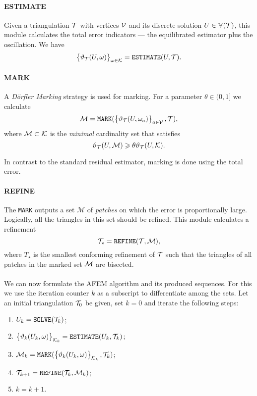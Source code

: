 \documentclass[thesis.tex]{subfiles}
\begin{document}
\paragraph{ESTIMATE} Given a triangulation $\mathcal{T}$ with vertices $\mathcal{V}$ and its discrete solution $U \in \mathbb{V}(\mathcal{T})$, this module 
calculates the total error indicators --- the equilibrated estimator plus the oscillation. We have
\[
  \set{\vartheta_{\mathcal{T}}(U, \omega)}_{\omega \in \mathcal{K}} = \texttt{ESTIMATE}(U, \mathcal{T}).
\]
\paragraph{MARK}
A \emph{D\"orfler Marking} strategy is used for marking. For a parameter $\theta \in (0,1]$ we calculate
\[
  \mathcal{M} = \texttt{MARK}( \set{\vartheta_{\mathcal{T}}(U, \omega_a)}_{a \in \mathcal{V}}, \mathcal{T}),
\]
where $\mathcal{M} \subset \mathcal{K}$ is the \emph{minimal} cardinality set that satisfies
\[
  \vartheta_{\mathcal{T}}(U,\mathcal{M}) \geqslant \theta \vartheta_{\mathcal{T}}(U, \mathcal{K}).
\]
\begin{rem}
  In contrast to the standard residual estimator, marking is done using the total error.
\end{rem}
\paragraph{REFINE}
The \texttt{MARK} outputs a set $\mathcal{M}$ of \emph{patches} on which the error is proportionally large. 
Logically, all the triangles in this set should be refined. This module calculates a refinement
\[
  \mathcal{T}_\star = \texttt{REFINE}(\mathcal{T}, \mathcal{M}),
\]
where $T_\star$ is the smallest conforming refinement of $\mathcal{T}$ such that the triangles of
all patches in the marked set $\mathcal{M}$ are bisected.
\\\\
We can now formulate the AFEM algorithm and its produced sequences. For this we use the
iteration counter $k$ as a subscript to differentiate among the sets.
Let an initial triangulation $\mathcal{T}_0$ be given, set $k = 0$ and iterate the following steps:
\begin{enumerate}
\item $U_k = \texttt{SOLVE}(\mathcal{T}_k)$;
\item $\set{\vartheta_k(U_k, \omega)}_{\mathcal{K}_k} = \texttt{ESTIMATE}(U_k, \mathcal{T}_k)$;
  \item $\mathcal{M}_k = \texttt{MARK}(\set{\vartheta_k(U_k, \omega)}_{\mathcal{K}_k}, \mathcal{T}_k)$;
  \item $\mathcal{T}_{k+1} = \texttt{REFINE}(\mathcal{T}_k, \mathcal{M}_k)$;
  \item $k  = k + 1$.
\end{enumerate}
\end{document}
